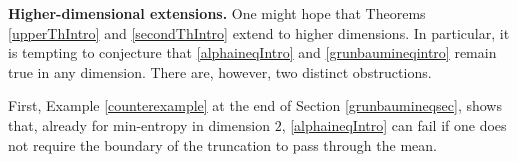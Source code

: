 \documentclass{article}
\theoremstyle{plain}
\theoremstyle{definition}
\newcommand{\1}{\mathbf 1}
\begin{document}

\medskip

{\bf Higher-dimensional extensions.} One might hope that Theorems \ref{upperThIntro} and \ref{secondThIntro} extend to higher dimensions. In particular, it is tempting to conjecture that \eqref{alphaineqIntro} and \eqref{grunbaumineqintro} remain true in any dimension. There are, however, two distinct obstructions.

First, Example \ref{counterexample} at the end of Section \ref{grunbaumineqsec}, shows that, already for min-entropy in dimension $2$, \eqref{alphaineqIntro} can fail if one does not require the boundary of the truncation to pass through the mean. 
\end{document}
